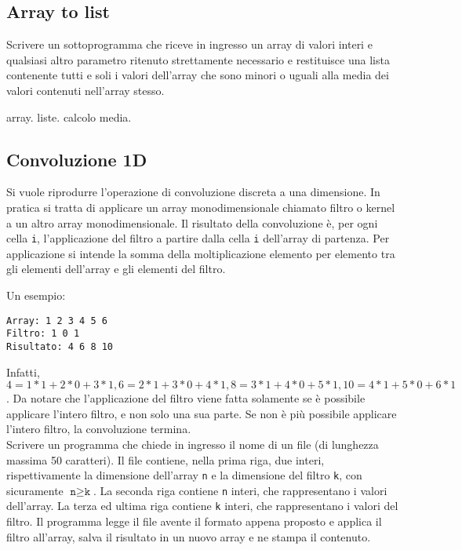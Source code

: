 \subsection{Array to list}
Scrivere un sottoprogramma che riceve in ingresso un array di valori interi e qualsiasi altro parametro ritenuto strettamente necessario e restituisce una lista contenente tutti e soli i valori dell'array che sono minori o uguali alla media dei valori contenuti nell'array stesso.

\begin{tags}
array. liste. calcolo media.
\end{tags}


\subsection{Convoluzione 1D}
Si vuole riprodurre l'operazione di convoluzione discreta a una dimensione.
In pratica si tratta di applicare un array monodimensionale chiamato filtro o kernel a un altro array monodimensionale.
Il risultato della convoluzione \`e, per ogni cella \texttt{i}, l'applicazione del filtro a partire dalla cella \texttt{i} dell'array di partenza.
Per applicazione si intende la somma della moltiplicazione elemento per elemento tra gli elementi dell'array e gli elementi del filtro.

Un esempio:

\begin{verbatim}
Array: 1 2 3 4 5 6
Filtro: 1 0 1
Risultato: 4 6 8 10
\end{verbatim}
Infatti, $4 = 1*1 + 2*0 + 3*1, 6=2*1 + 3*0 + 4*1, 8 = 3*1 + 4*0 + 5*1, 10 = 4*1 + 5*0 + 6*1$.
Da notare che l'applicazione del filtro viene fatta solamente se \`e possibile applicare l'intero filtro, e non solo una sua parte. 
Se non \`e pi\`u possibile applicare l'intero filtro, la convoluzione termina.
\\
Scrivere un programma che chiede in ingresso il nome di un file (di lunghezza massima 50 caratteri).
Il file contiene, nella prima riga, due interi, rispettivamente la dimensione dell'array \texttt{n} e la dimensione del filtro \texttt{k}, con sicuramente $\texttt{n} \geq \texttt{k}$.
La seconda riga contiene \texttt{n} interi, che rappresentano i valori dell'array.
La terza ed ultima riga contiene \texttt{k} interi, che rappresentano i valori del filtro.
Il programma legge il file avente il formato appena proposto e applica il filtro all'array, salva il risultato in un nuovo array e ne stampa il contenuto.

